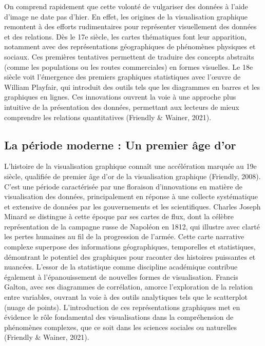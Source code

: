 \documentclass[
  letterpaper,
  DIV=11,
  numbers=noendperiod]{scrreprt}
\begin{document}
On comprend rapidement que cette volonté de vulgariser des données à
l'aide d'image ne date pas d'hier. En effet, les origines de la
visualisation graphique remontent à des efforts rudimentaires pour
représenter visuellement des données et des relations. Dès le 17e
siècle, les cartes thématiques font leur apparition, notamment avec des
représentations géographiques de phénomènes physiques et sociaux. Ces
premières tentatives permettent de traduire des concepts abstraits
(comme les populations ou les routes commerciales) en formes visuelles.
Le 18e siècle voit l'émergence des premiers graphiques statistiques avec
l'œuvre de William Playfair, qui introduit des outils tels que les
diagrammes en barres et les graphiques en lignes. Ces innovations
ouvrent la voie à une approche plus intuitive de la présentation des
données, permettant aux lecteurs de mieux comprendre les relations
quantitatives (Friendly \& Wainer, 2021).

\hypertarget{la-puxe9riode-moderne-un-premier-uxe2ge-dor}{%
\subsection{La période moderne : Un premier âge
d'or}\label{la-puxe9riode-moderne-un-premier-uxe2ge-dor}}

L'histoire de la visualisation graphique connaît une accélération
marquée au 19e siècle, qualifiée de premier âge d'or de la visualisation
graphique (Friendly, 2008). C'est une période caractérisée par une
floraison d'innovations en matière de visualisation des données,
principalement en réponse à une collecte systématique et extensive de
données par les gouvernements et les scientifiques. Charles Joseph
Minard se distingue à cette époque par ses cartes de flux, dont la
célèbre représentation de la campagne russe de Napoléon en 1812, qui
illustre avec clarté les pertes humaines au fil de la progression de
l'armée. Cette carte narrative complexe superpose des informations
géographiques, temporelles et statistiques, démontrant le potentiel des
graphiques pour raconter des histoires puissantes et nuancées. L'essor
de la statistique comme discipline académique contribue également à
l'épanouissement de nouvelles formes de visualisation. Francis Galton,
avec ses diagrammes de corrélation, amorce l'exploration de la relation
entre variables, ouvrant la voie à des outils analytiques tels que le
scatterplot (nuage de points). L'introduction de ces représentations
graphiques met en évidence le rôle fondamental des visualisations dans
la compréhension de phénomènes complexes, que ce soit dans les sciences
sociales ou naturelles (Friendly \& Wainer, 2021).
\end{document}
